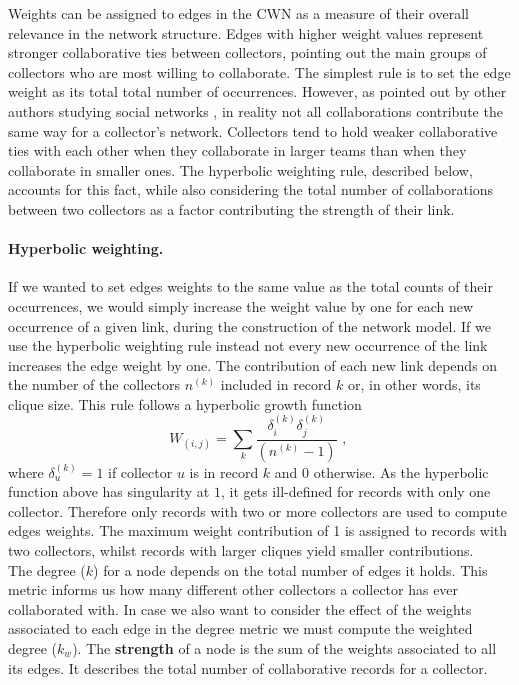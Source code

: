 Weights can be assigned to edges in the CWN as a measure of their overall relevance in the network structure. Edges with higher weight values represent stronger collaborative ties between collectors, pointing out the main groups of collectors who are most willing to collaborate. 
The simplest rule is to set the edge weight as its total total number of occurrences. However, as pointed out by other authors studying social networks \cite{Newman2001a}, in reality not all collaborations contribute the same way for a collector's network. 
Collectors tend to hold weaker collaborative ties with each other when they collaborate in larger teams than when they collaborate in smaller ones. The hyperbolic weighting rule, described below, accounts for this fact, while also considering the total number of collaborations between two collectors as a factor contributing the strength of their link.

\paragraph*{Hyperbolic weighting.}
If we wanted to set edges weights to the same value as the total counts of their occurrences, we would simply increase the weight value by one for each new occurrence of a given link, during the construction of the network model. 
If we use the hyperbolic weighting rule instead not every new occurrence of the link increases the edge weight by one. 
The contribution of each new link depends on the number of the collectors $n^{(k)}$ included in record $k$ or, in other words, its clique size. 
This rule follows a hyperbolic growth function 
\begin{equation}
W_{(i,j)} = \sum\limits_k \frac{\delta_i^{(k)} \delta_j^{(k)}}{(n^{(k)}-1)} \mbox{ , }
\end{equation}
where $\delta^{(k)}_u = 1$ if collector $u$ is in record $k$ and $0$ otherwise.
As the hyperbolic function above has singularity at $1$, it gets ill-defined for records with only one collector. 
Therefore only records with two or more collectors are used to compute edges weights. 
The maximum weight contribution of 1 is assigned to records with two collectors, whilst records with larger cliques yield smaller contributions.\\





The degree ($k$) for a node depends on the total number of edges it holds. 
This metric informs us how many different other collectors a collector has ever collaborated with.
In case we also want to consider the effect of the weights associated to each edge in the degree metric we must compute the weighted degree ($k_w$).
The \textbf{strength} of a node is the sum of the weights associated to all its edges. It describes the total number of collaborative records for a collector.


